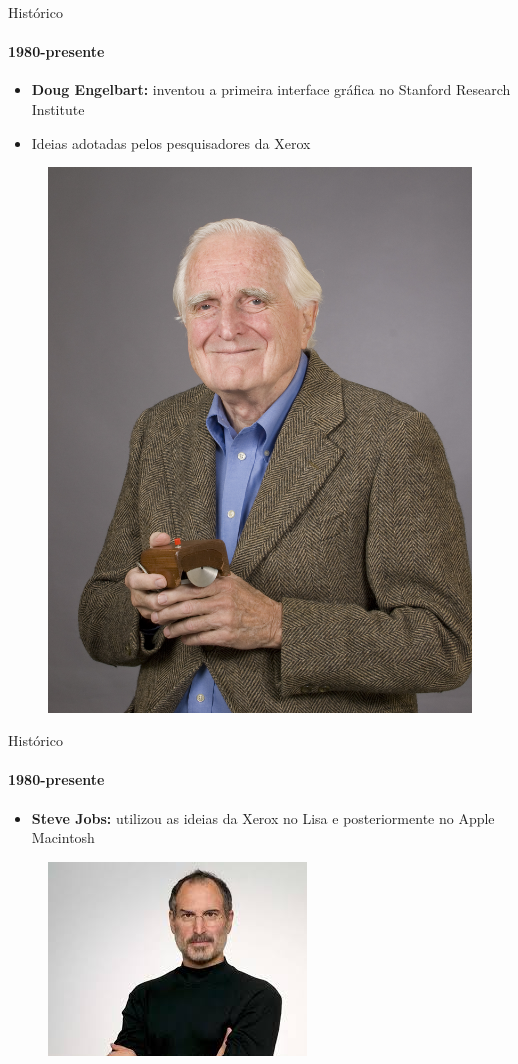 \documentclass{beamer}
\begin{document}
\begin{frame}{Histórico}
	\framesubtitle{1980-presente}
	\begin{itemize}
		\item \textbf{Doug Engelbart:} inventou a primeira interface gráfica no Stanford Research Institute
		\item Ideias adotadas pelos pesquisadores da Xerox
	\end{itemize}
	\begin{figure}
		\includegraphics[width=0.3\paperwidth]{resources/doug}
	\end{figure}
\end{frame}
\begin{frame}{Histórico}
	\framesubtitle{1980-presente}
	\begin{itemize}
		\item \textbf{Steve Jobs:} utilizou as ideias da Xerox no Lisa e posteriormente no Apple Macintosh
	\end{itemize}
	\begin{figure}
		\includegraphics[width=0.4\paperwidth]{resources/jobs}
	\end{figure}
\end{frame}
\end{document}
